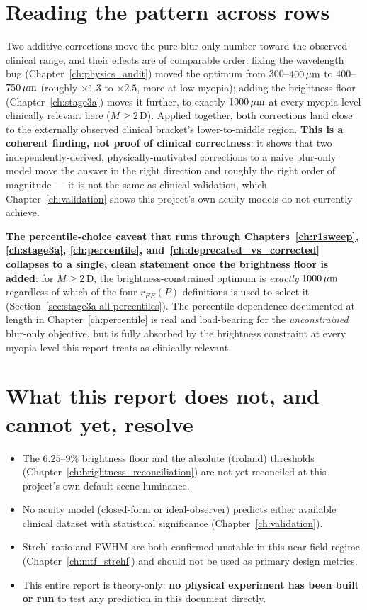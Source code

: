 \section{Reading the pattern across rows}

Two additive corrections move the pure blur-only number toward the observed clinical
range, and their effects are of comparable order: fixing the wavelength bug
(Chapter~\ref{ch:physics_audit}) moved the optimum from $300$--$400\,\mu\text{m}$ to
$400$--$750\,\mu\text{m}$ (roughly $\times1.3$ to $\times2.5$, more at low myopia); adding the
brightness floor (Chapter~\ref{ch:stage3a}) moves it further, to exactly $1000\,\mu\text{m}$ at
every myopia level clinically relevant here ($M\ge2\,$D). Applied together, both
corrections land close to the externally observed clinical bracket's lower-to-middle
region. \textbf{This is a coherent finding, not proof of clinical correctness}: it
shows that two independently-derived, physically-motivated corrections to a naive
blur-only model move the answer in the right direction and roughly the right order of
magnitude --- it is not the same as clinical validation, which Chapter~\ref{ch:validation}
shows this project's own acuity models do not currently achieve.

\textbf{The percentile-choice caveat that runs through Chapters~\ref{ch:r1sweep},
\ref{ch:stage3a}, \ref{ch:percentile}, and~\ref{ch:deprecated_vs_corrected} collapses
to a single, clean statement once the brightness floor is added}: for $M\ge2\,$D, the
brightness-constrained optimum is \emph{exactly} $1000\,\mu\text{m}$ regardless of which of the
four $r_{EE}(P)$ definitions is used to select it (Section~\ref{sec:stage3a-all-percentiles}).
The percentile-dependence documented at length in Chapter~\ref{ch:percentile} is real
and load-bearing for the \emph{unconstrained} blur-only objective, but is fully
absorbed by the brightness constraint at every myopia level this report treats as
clinically relevant.

\section{What this report does not, and cannot yet, resolve}

\begin{itemize}
\item The $6.25$--$9\%$ brightness floor and the absolute (troland) thresholds
  (Chapter~\ref{ch:brightness_reconciliation}) are not yet reconciled at this
  project's own default scene luminance.
\item No acuity model (closed-form or ideal-observer) predicts either available
  clinical dataset with statistical significance (Chapter~\ref{ch:validation}).
\item Strehl ratio and FWHM are both confirmed unstable in this near-field regime
  (Chapter~\ref{ch:mtf_strehl}) and should not be used as primary design metrics.
\item This entire report is theory-only: \textbf{no physical experiment has been built
  or run} to test any prediction in this document directly.
\end{itemize}
